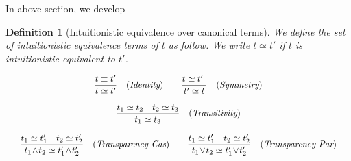 \documentclass[12pt]{article}
\newtheorem{Definition}{Definition}[section]
\begin{document}
In above section, we develop


\pagebreak
\begin{Definition}[Intuitionistic equivalence over canonical terms]
  \label{equality_on_CANONICALS}
  We define the set of intuitionistic equivalence terms of $t$ as follow.
  We write $t \simeq t'$ if $t$ is intuitionistic equivalent to $t'$.
  
  \begin{displaymath}
    \begin{array}{c}
      
      \begin{array}{rll}
        \begin{array}{rl}
          \dfrac{t \equiv t'}{
            t \simeq t'
          }  &  (\text{\it Identity})
        \end{array}
        
        & \begin{array}{rl}
            \dfrac{
              t \simeq t'\
            }{
              t' \simeq t
            }  &  (\text{\it Symmetry})        
          \end{array}  \\
      \end{array}  \\
      \\
      \begin{array}{rl}
        \dfrac{t_1 \simeq t_2 \quad t_2 \simeq t_3}{
          t_1 \simeq t_3
        }  &  (\text{\it Transitivity})
      \end{array}  \\
      \\
      
      \begin{array}{ll}
        \begin{array}{rl}
          \dfrac{t_1 \simeq t'_1 \quad t_2 \simeq t'_2}{
            t_1 \!\wedge\! t_2 \simeq t'_1 \!\wedge\! t'_2
          }  &  (\text{\it Transparency-Cas})
        \end{array}
        
        & \begin{array}{rl}
            \dfrac{t_1 \simeq t'_1 \quad t_2 \simeq t'_2}{
              t_1 \!\vee\! t_2 \simeq t'_1 \!\vee\! t'_2
            }  &  (\text{\it Transparency-Par})
          \end{array}
      \end{array}  \\
      \\
      

\end{array}
\end{displaymath}
\end{Definition}
\end{document}
